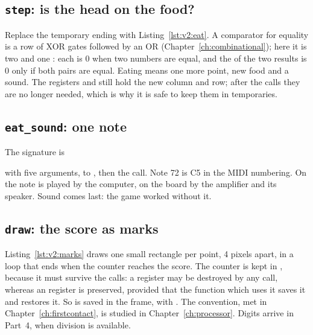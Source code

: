 \subsection{\texttt{step}: is the head on the food?}


Replace the temporary ending with Listing~\ref{lst:v2:eat}. A comparator for
equality is a row of XOR gates followed by an OR
(Chapter~\ref{ch:combinational}); here it is two  and one :
each  is 0 when two numbers are equal, and the  of the two
results is 0 only if both pairs are equal. Eating means one more point, new
food and a sound. The registers  and  still hold the new
column and row; after the calls they are no longer needed, which is why it is
safe to keep them in temporaries.

\subsection{\texttt{eat\_sound}: one note}


The signature is
\begin{center}\end{center}
with five arguments,  to , then the call. Note 72 is C5 in the
MIDI numbering. On \prgqt the note is played by the computer, on the board by
the amplifier and its speaker. Sound comes last: the game worked without it.

\subsection{\texttt{draw}: the score as marks}


Listing~\ref{lst:v2:marks} draws one small rectangle per point, 4 pixels
apart, in a loop that ends when the counter reaches the score. The counter is
kept in , because it must survive the calls: a  register may be
destroyed by any call, whereas an  register is preserved, provided
that the function which uses it saves it and restores it. So  is
saved in the frame, with . The convention, met in
Chapter~\ref{ch:firstcontact}, is studied in Chapter~\ref{ch:processor}. Digits arrive in Part~4, when division is
available.

